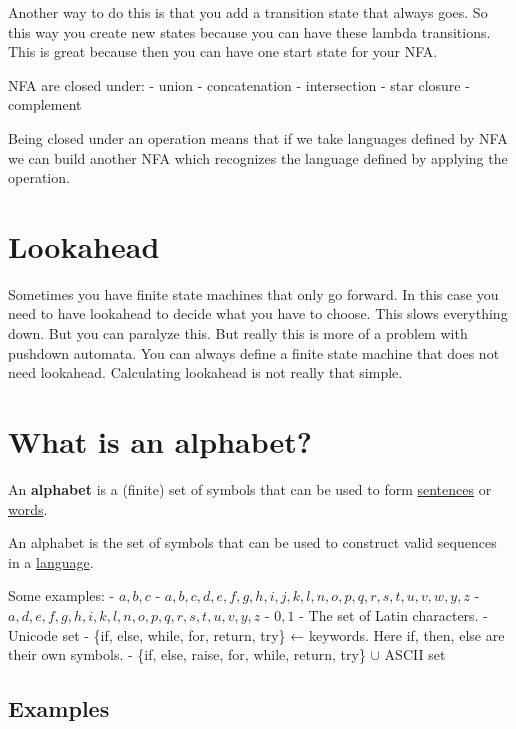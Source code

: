 \documentclass[
  11pt,
  british,
]{article}
\begin{document}
Another way to do this is that you add a transition state that always
goes. So this way you create new states because you can have these
lambda transitions. This is great because then you can have one start
state for your NFA.

NFA are closed under: - union - concatenation - intersection - star
closure - complement

Being closed under an operation means that if we take languages defined
by NFA we can build another NFA which recognizes the language defined by
applying the operation.

\hypertarget{lookahead}{%
\section{Lookahead}\label{lookahead}}

Sometimes you have finite state machines that only go forward. In this
case you need to have lookahead to decide what you have to choose. This
slows everything down. But you can paralyze this. But really this is
more of a problem with pushdown automata. You can always define a finite
state machine that does not need lookahead. Calculating lookahead is not
really that simple.

\hypertarget{what-is-an-alphabet}{%
\section{What is an alphabet?}\label{what-is-an-alphabet}}

An \textbf{alphabet} is a (finite) set of symbols that can be used to
form \href{../Data/Sentences.md}{sentences} or
\href{../Data/Words.md}{words}.

An alphabet is the set of symbols that can be used to construct valid
sequences in a \href{../Languages.md}{language}.

Some examples: - \({a, b, c}\) -
\({a, b, c, d, e, f, g, h,i, j, k, l,n, o,p, q,r,s, t,u, v,w, y,z}\) -
\({a, d, e, f,g, h, i, k,l, n, o, p,q, r, s, t, u, v,y, z}\) - \({0,1}\)
- The set of Latin characters. - Unicode set - \{if, else, while, for,
return, try\} ← keywords. Here if, then, else are their own symbols. -
\{if, else, raise, for, while, return, try\} \(\cup\) ASCII set

\hypertarget{examples-4}{%
\subsection{Examples}\label{examples-4}}
\end{document}
